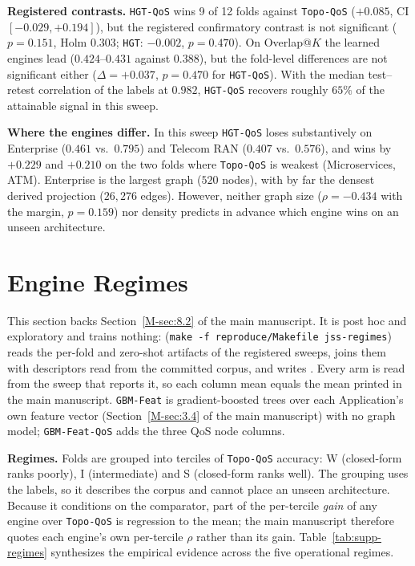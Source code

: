 \documentclass[preprint,3p]{elsarticle}
\begin{document}
\noindent\textbf{Registered contrasts.} \texttt{HGT-QoS} wins 9 of 12 folds against \texttt{Topo-QoS} ($+0.085$, CI $[-0.029, +0.194]$), but the registered confirmatory contrast is not significant ($p = 0.151$, Holm $0.303$; \texttt{HGT}: $-0.002$, $p = 0.470$). On Overlap@$K$ the learned engines lead ($0.424$--$0.431$ against $0.388$), but the fold-level differences are not significant either ($\Delta = +0.037$, $p = 0.470$ for \texttt{HGT-QoS}). With the median test--retest correlation of the labels at $0.982$, \texttt{HGT-QoS} recovers roughly $65\%$ of the attainable signal in this sweep.

\noindent\textbf{Where the engines differ.} In this sweep \texttt{HGT-QoS} loses substantively on Enterprise ($0.461$ vs.\ $0.795$) and Telecom RAN ($0.407$ vs.\ $0.576$), and wins by $+0.229$ and $+0.210$ on the two folds where \texttt{Topo-QoS} is weakest (Microservices, ATM). Enterprise is the largest graph ($520$ nodes), with by far the densest derived projection ($26{,}276$ edges). However, neither graph size ($\rho = -0.434$ with the margin, $p = 0.159$) nor density predicts in advance which engine wins on an unseen architecture.

\section{Engine Regimes}
\label{supp:regimes}

This section backs Section~\ref{M-sec:8.2} of the main manuscript. It is post hoc and exploratory and trains nothing:  (\texttt{make -f reproduce/Makefile jss-regimes}) reads the per-fold and zero-shot artifacts of the registered sweeps, joins them with descriptors read from the committed corpus, and writes . Every arm is read from the sweep that reports it, so each column mean equals the mean printed in the main manuscript. \texttt{GBM-Feat} is gradient-boosted trees over each Application's own feature vector (Section~\ref{M-sec:3.4} of the main manuscript) with no graph model; \texttt{GBM-Feat-QoS} adds the three QoS node columns.

\noindent\textbf{Regimes.} Folds are grouped into terciles of \texttt{Topo-QoS} accuracy: W (closed-form ranks poorly), I (intermediate) and S (closed-form ranks well). The grouping uses the labels, so it describes the corpus and cannot place an unseen architecture. Because it conditions on the comparator, part of the per-tercile \emph{gain} of any engine over \texttt{Topo-QoS} is regression to the mean; the main manuscript therefore quotes each engine's own per-tercile $\rho$ rather than its gain. Table~\ref{tab:supp-regimes} synthesizes the empirical evidence across the five operational regimes.
\end{document}
